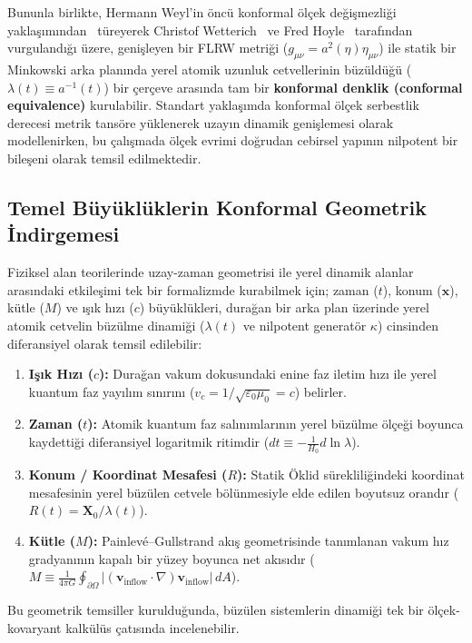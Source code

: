 \documentclass[11pt,a4paper]{article}
\begin{document}
Bununla birlikte, Hermann Weyl'in öncü konformal ölçek değişmezliği yaklaşımından~\cite{weyl1918} türeyerek Christof Wetterich~\cite{wetterich2013} ve Fred Hoyle~\cite{hoyle1964} tarafından vurgulandığı üzere, genişleyen bir FLRW metriği ($g_{\mu\nu} = a^2(\eta) \eta_{\mu\nu}$) ile statik bir Minkowski arka planında yerel atomik uzunluk cetvellerinin büzüldüğü ($\lambda(t) \equiv a^{-1}(t)$) bir çerçeve arasında tam bir \textbf{konformal denklik (conformal equivalence)} kurulabilir. Standart yaklaşımda konformal ölçek serbestlik derecesi metrik tansöre yüklenerek uzayın dinamik genişlemesi olarak modellenirken, bu çalışmada ölçek evrimi doğrudan cebirsel yapının nilpotent bir bileşeni olarak temsil edilmektedir.

\subsection{Temel Büyüklüklerin Konformal Geometrik İndirgemesi}
\label{sec:geometrik_indirgeme}

Fiziksel alan teorilerinde uzay-zaman geometrisi ile yerel dinamik alanlar arasındaki etkileşimi tek bir formalizmde kurabilmek için; zaman ($t$), konum ($\mathbf{x}$), kütle ($M$) ve ışık hızı ($c$) büyüklükleri, durağan bir arka plan üzerinde yerel atomik cetvelin büzülme dinamiği ($\lambda(t)$ ve nilpotent generatör $\kappa$) cinsinden diferansiyel olarak temsil edilebilir:
\begin{enumerate}
    \item \textbf{Işık Hızı ($c$):} Durağan vakum dokusundaki enine faz iletim hızı ile yerel kuantum faz yayılım sınırını ($v_c = 1/\sqrt{\varepsilon_0\mu_0} = c$) belirler.
    \item \textbf{Zaman ($t$):} Atomik kuantum faz salınımlarının yerel büzülme ölçeği boyunca kaydettiği diferansiyel logaritmik ritimdir ($dt \equiv -\frac{1}{H_0} d\ln\lambda$).
    \item \textbf{Konum / Koordinat Mesafesi ($R$):} Statik Öklid sürekliliğindeki koordinat mesafesinin yerel büzülen cetvele bölünmesiyle elde edilen boyutsuz orandır ($R(t) = \mathbf{X}_0 / \lambda(t)$).
    \item \textbf{Kütle ($M$):} Painlevé--Gullstrand akış geometrisinde tanımlanan vakum hız gradyanının kapalı bir yüzey boyunca net akısıdır ($M \equiv \frac{1}{4\pi G} \oint_{\partial \Omega} |(\mathbf{v}_{\mathrm{inflow}} \cdot \nabla) \mathbf{v}_{\mathrm{inflow}}| \, dA$).
\end{enumerate}
Bu geometrik temsiller kurulduğunda, büzülen sistemlerin dinamiği tek bir ölçek-kovaryant kalkülüs çatısında incelenebilir.
\end{document}
